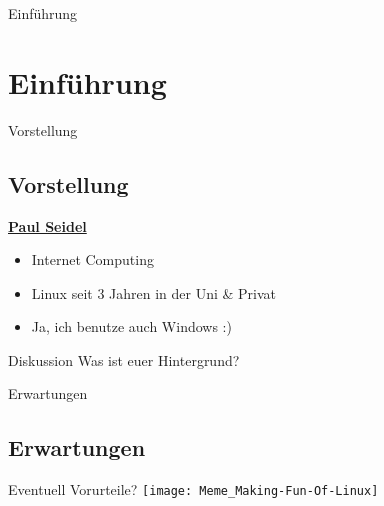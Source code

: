 
\begin{frame}{Einführung}
    \section{Einführung}\label{sec:einfuhrung}
\end{frame}

\begin{frame}{Vorstellung}
    \subsection{Vorstellung}\label{subsec:vorstellung}

    \underline{\textbf{Paul Seidel}}

    \begin{itemize}
        \item Internet Computing
        \item Linux seit 3 Jahren in der Uni \& Privat
        \item Ja, ich benutze auch Windows :)
    \end{itemize}

    \pause
    \vspace{0.5cm}
    \begin{alertblock}{Diskussion}
        Was ist euer Hintergrund?
    \end{alertblock}

\end{frame}
\begin{frame}{Erwartungen}
    \subsection{Erwartungen}\label{subsec:erwartungen}
    Eventuell Vorurteile?
    \vspace{0.5cm}\pause
    \newline
    \texttt{[image: Meme\_Making-Fun-Of-Linux]}
\end{frame}

